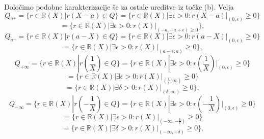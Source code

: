 \documentclass[a4paper, 12pt]{article}
\newcommand{\R}{\mathbb{R}}
\begin{document}
\begin{enumerate}
Določimo podobne karakterizacije še za ostale ureditve iz točke (b). Velja 
$$
Q_{a^+} = \{r\in \R(X)| r(X-a) \in Q\} = \{r\in \R(X)| \exists \epsilon >0: r(X-a)|_{(0,\epsilon)} \ge 0\}
$$
$$
= \{r\in \R(X)| \exists \epsilon >0: r(X)|_{(-a,-a+\epsilon) \ge 0}\},
$$
$$
Q_{a^-} = \{r\in \R(X)|r(a-X) \in Q\} =  \{ r\in \R(X)|\exists \epsilon >0: r(a-X)|_{(0,\epsilon)}\ge 0\}
$$
$$
= \{r\in \R(X)| \exists \epsilon >0: r(X)|_{(a-\epsilon,a)} \ge 0\},
$$
$$
Q_{+\infty} = \{r\in \R(X)|r(\frac{1}{X}) \in Q\} = \{r\in \R(X)|\exists \epsilon >0: r(\frac{1}{X})|_{(0,\epsilon)} \ge 0\}
$$
$$
= \{r\in \R(X)| \exists \epsilon >0 : r(X)|_{(\frac{1}{\epsilon},\infty)}\ge 0\} 
$$
$$
= \{r\in \R(X)| \exists \delta >0 : r(X)|_{(\delta,\infty)}\ge 0\},
$$
$$
Q_{-\infty} = \{r\in \R(X) | r(-\frac{1}{X}) \in Q\} = \{ r\in \R(X)| \exists \epsilon >0: r(-\frac{1}{X})|_{(0,\epsilon)} \ge 0 \}
$$
$$
= \{r\in \R(X)| \exists \epsilon >0 : r(X)|_{(-\infty, -\frac{1}{\epsilon})} \ge 0\}
$$
$$
=\{r\in \R(X)| \exists \delta > 0: r(X)|_{(-\infty,-\delta)} \ge 0\}.
$$


\end{enumerate}
\end{document}
